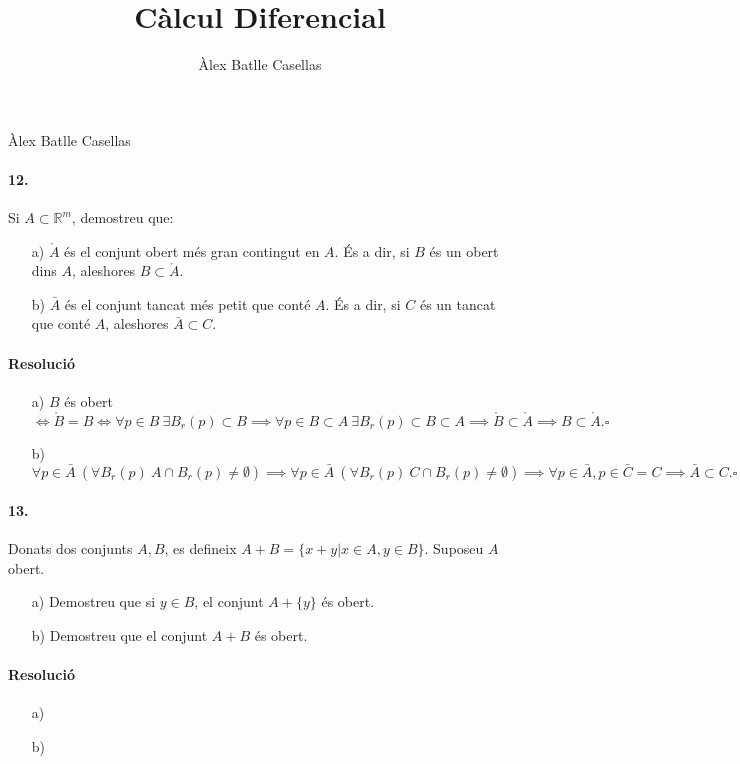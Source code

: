 \documentclass[11pt]{article}
\title{Càlcul Diferencial}
\author{Àlex Batlle Casellas}
\newcommand{\Rm}{\mathbb{R}^m}
\begin{document}
\begin{small}
Àlex Batlle Casellas
\end{small}
\paragraph{12.} Si $A\subset\Rm$, demostreu que:
\begin{itemize}
	\item[a)] $\mathring A$ és el conjunt obert més gran contingut en $A$. És a dir, si $B$ és un obert dins $A$, aleshores $B\subset\mathring A$.
	\item[b)] $\bar{A}$ és el conjunt tancat més petit que conté $A$. És a dir, si $C$ és un tancat que conté $A$, aleshores $
\bar{A}\subset C$.
\end{itemize}
\paragraph{Resolució}
\begin{itemize}
	\item[a)] $B$ és obert$\iff\mathring B=B\iff\forall p\in B\ \exists B_r(p)\subset B\implies\forall p\in B\subset A\ \exists B_r(p)\subset B\subset A\implies\mathring B\subset\mathring A\implies B\subset\mathring A.\square$
	\item[b)] $\forall p\in\bar{A}\ (\forall B_r(p)\ A\cap B_r(p)\neq\emptyset)\implies\forall p\in\bar{A}\ (\forall B_r(p)\ C\cap B_r(p)\neq\emptyset)\implies\forall p\in\bar{A},p\in\bar{C}=C\implies\bar{A}\subset C.\square$
\end{itemize}
\paragraph{13.} Donats dos conjunts $A,B$, es defineix $A+B=\{x+y\vert x\in A, y\in B\}$. Suposeu $A$ obert.
\begin{itemize}
	\item[a)] Demostreu que si $y\in B$, el conjunt $A+\{y\}$ és obert.
	\item[b)] Demostreu que el conjunt $A+B$ és obert.
\end{itemize}
\paragraph{Resolució}
\begin{itemize}
	\item[a)]
	\item[b)]
\end{itemize}
\end{document}
